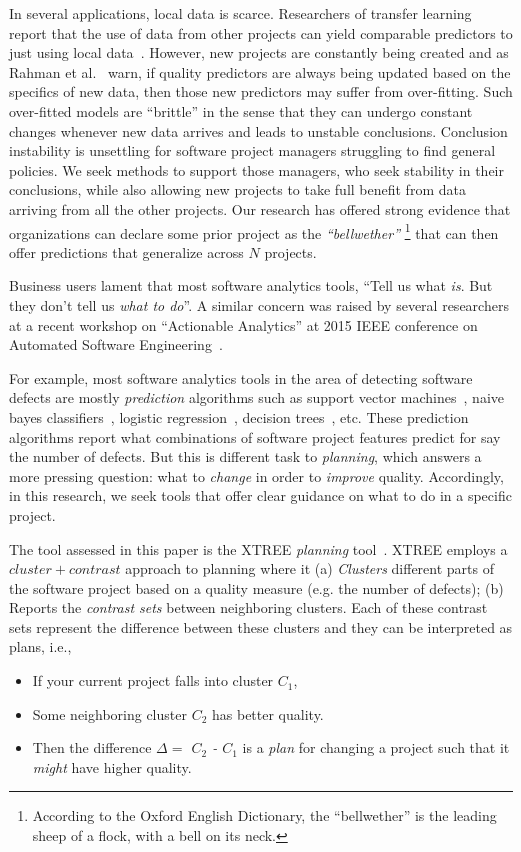 \documentclass[conference]{IEEEtran}
\begin{document}
In several applications, local data is scarce. Researchers of transfer learning report that the use of data from other projects can yield comparable predictors to just using local data~\cite{peters15}. However, new projects are constantly being created and as Rahman et al.~\cite{rahman12} warn, if quality predictors are always being updated based on the specifics of new data, then those new predictors may suffer from over-fitting. Such over-fitted models are ``brittle'' in the sense that they can undergo constant changes whenever new data arrives and leads to unstable conclusions. Conclusion instability is unsettling for software project managers struggling to find general policies.
We seek methods to support those managers, who seek stability
in their conclusions, while also allowing new projects
to take full benefit from data arriving
from all the other projects. Our research has offered strong evidence that organizations can declare some prior project as  the {\em ``bellwether''}  \footnote{According to the Oxford English Dictionary, the ``bellwether'' is the leading sheep of a flock, with a bell on its neck.} that can then offer predictions that generalize across $N$ projects.


Business users lament that most software analytics tools, ``Tell us what \textit{is}. But they don't tell us \textit{what to do}''. A similar concern was raised by several researchers at a recent workshop on ``Actionable Analytics'' at 2015 IEEE conference on Automated Software Engineering~\cite{hihn15}. 

For example, most software analytics tools in the area of detecting software defects are mostly \textit{prediction} algorithms such as support vector machines~\cite{cortes95}, naive bayes classifiers~\cite{lessmann08}, logistic regression~\cite{lessmann08}, decision trees~\cite{dtrees}, etc. These prediction algorithms report what combinations of software project features predict for say the number of defects. But this is different task to \textit{planning}, which answers a more pressing question: what to {\em change} in order to {\em improve} quality. Accordingly, in this research, we seek tools that offer clear guidance on what to do in a specific project.

The tool assessed in this paper is the XTREE \textit{planning} tool~\cite{krishna17a}. XTREE employs a $cluster+contrast$ approach to planning where it (a) \textit{Clusters} different parts of the software project based on a quality measure (e.g. the number of defects); (b) Reports the \textit{contrast sets} between neighboring clusters. Each of these contrast sets represent the difference between these clusters and they can  be interpreted as plans, i.e., 
\begin{itemize}
	    \item If your current project falls into cluster $C_1$,
	    \item Some neighboring cluster $C_2$ has better quality.
	    \item Then the difference {\em $\Delta=$ $C_2$ - $C_1$} is a {\em plan} for changing a  project such that it \textit{might} have   higher quality.
\end{itemize}
\end{document}
